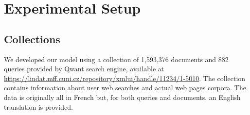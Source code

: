 \newpage
\section{Experimental Setup}
\label{sec:setup}

\subsection{Collections}
We developed our model using a collection of 1,593,376 documents and 882 queries provided by Qwant search engine, available at \url{https://lindat.mff.cuni.cz/repository/xmlui/handle/11234/1-5010}.
\newline
The collection contains information about user web searches and actual web pages corpora. The data is originally all in French but, for both queries and documents, an English translation is provided.


